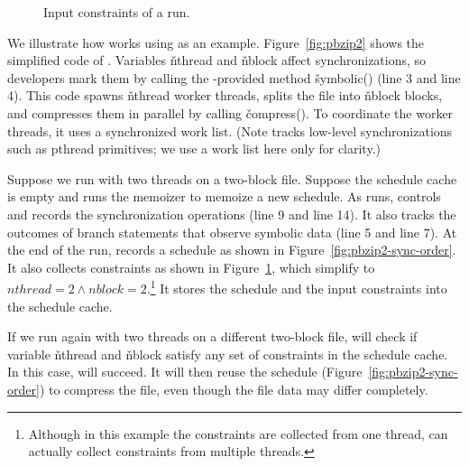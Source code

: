 \begin{figure}[t]
\centering
\begin{minipage}[c]{0.4\linewidth}
\tiny {}
\end{minipage}
\caption{\small Input constraints of a \pbzip run.}
\label{fig:pbzip2-constraints}
\end{figure}

We illustrate how \tern works using \pbzip as an example.
Figure~\ref{fig:pbzip2} shows the simplified code of \pbzip.  Variables
\v{nthread} and \v{nblock} affect synchronizations, so developers mark
them by calling the \tern-provided method \v{symbolic()} (line 3 and line 4).  This
code spawns \v{nthread} worker threads, splits the file into \v{nblock}
blocks, and compresses them in parallel by calling \v{compress()}.  To
coordinate the worker threads, it uses a synchronized work list. (Note \tern tracks
low-level synchronizations such as pthread primitives; we use a work list
here only for clarity.)

Suppose we run \pbzip with two threads on a two-block file.  Suppose the
schedule cache is empty and \tern runs the memoizer to memoize a new
schedule.  As \pbzip runs, \tern controls and records the synchronization
operations (line 9 and line 14).  It also tracks the outcomes of branch
statements that observe symbolic data (line 5 and line 7).  At the end of the
run, \tern records a schedule as shown in
Figure~\ref{fig:pbzip2-sync-order}.  It also collects constraints as shown
in Figure~\ref{fig:pbzip2-constraints}, which simplify to $nthread=2
\wedge nblock=2$.\footnote{Although in this example the constraints are
  collected from one thread, \tern can actually collect constraints from
  multiple threads.}  It stores the schedule and the input constraints
into the schedule cache.

If we run \pbzip again with two threads on a different two-block file,
\tern will check if variable \v{nthread} and \v{nblock} satisfy any set of
constraints in the schedule cache.  In this case, \tern will succeed.  It
will then reuse the schedule (Figure~\ref{fig:pbzip2-sync-order}) to
compress the file, even though the file data may differ completely.




